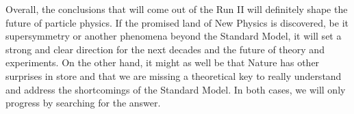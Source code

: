 Overall, the conclusions that will come out of the Run II will definitely shape
the future of particle physics. If the promised land of New Physics is
discovered, be it supersymmetry or another phenomena beyond the Standard Model,
it will set a strong and clear direction for the next decades and the future of
theory and experiments. On the other hand, it might as well be that Nature has
other surprises in store and that we are missing a theoretical key to really
understand and address the shortcomings of the Standard Model. In both cases, we
will only progress by searching for the answer.



\emptypage

\emptypage

\renewcommand{\leftmark}{Bibliography}

\begin{thebibliography}{2}

\singlespace



\end{thebibliography}


